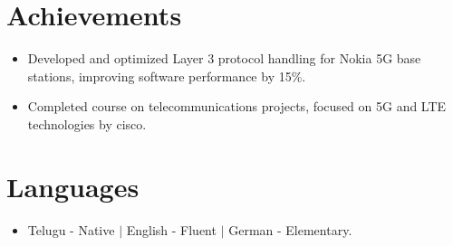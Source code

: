 \documentclass[letterpaper,11pt]{article}
\newcommand{\resumeItem}[1]{
  \item\small{
    {#1 \vspace{-2pt}}
  }
}
\newcommand{\resumeItemListStart}{\begin{itemize}}
\newcommand{\resumeItemListEnd}{\end{itemize}\vspace{-5pt}}
\begin{document}
\section{Achievements}
\resumeItemListStart
\resumeItem{Developed and optimized Layer 3 protocol handling for Nokia 5G base stations, improving software performance by 15\%.}
\resumeItem{Completed course on telecommunications projects, focused on 5G and LTE technologies by cisco.}
\resumeItemListEnd

\section*{Languages}
\begin{itemize}
  \item Telugu - Native $|$ English - Fluent $|$ German - Elementary.
\end{itemize}
\end{document}
